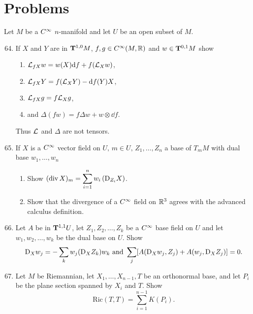 \documentclass[../main]{subfiles}
\begin{document}
\section*{Problems}
Let $M$ be a $\CInfty$ $n$-manifold and let $U$ be an open subset of $M$.

\begin{enumerate}
    \setcounter{enumi}{63}
    \item\label{pro:64} If $X$ and $Y$ are in $\tensorbundle{M}{1}{0}$, $f, g \in \CInfty(M, \bbR)$ and $w \in \tensorbundle{M}{0}{ 1}$ show 
    \begin{enumerate}[label=(\roman*)]
        \item $\liederiv{f X} w = w(X) \dd f + f(\liederiv{X} w)$,
        \item $\liederiv{f X} Y = f(\liederiv{X} Y) - \dd f(Y) X$,
        \item $\liederiv{f X} g = f \liederiv{X} g$,
        \item  and $\Delta(fw) = f \Delta w + w \otimes \dd f$.
    \end{enumerate}
    Thus $\liederiv{}$ and $\Delta$ are not tensors.
    
    \item\label{pro:65} If $X$ is a $\CInfty$ vector field on $U,\, m\in U, \,Z_{1}, \ldots, Z_{n}$ a base of $T_m M$ with dual base $w_{1}, \ldots, w_{n}$
    \begin{enumerate}[label=(\roman*)]
        \item Show $(\operatorname{div} X)_{m}=\displaystyle\sum_{i=1}^{n} w_{i}\left(\connection_{Z_i} X\right)$.
        \item  Show that the divergence of a $\CInfty$ field on $\bR^{3}$ agrees with the advanced calculus definition.
    \end{enumerate}
    
    
    \item\label{pro:66} Let $A$ be in $\tensorbundle{U}{1}{ 1}$, let $Z_1, Z_2, \ldots, Z_k$ be a $\CInfty$ base field on $U$ and let $w_1, w_2, \ldots, w_k$ be the dual base on $U$. Show \[\connection_X w_j = -\sum_k w_j(\connection_X Z_k) w_k\text{ and }\sum_j [A(\connection_X w_j, Z_j) + A(w_j, \connection_X Z_j)] = 0.\]
    
    \item\label{pro:67} Let $M$ be Riemannian, let $X_{1}, \ldots, X_{n-1}, T$ be an orthonormal base, and let $P_{i}$ be the plane section spanned by $X_{i}$ and $T$. Show \[\mathrm{Ric}(T, T)=\sum_{i=1}^{n-1} K\left(P_{i}\right).\]
    

\end{enumerate}
\end{document}
